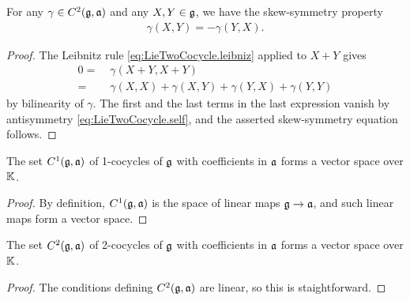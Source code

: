\begin{lemma}
  \label{lem:LieTwoCocycle_skew_symmetry}
  \leanok
  For any $\gamma \in C^2(\mathfrak{g},\mathfrak{a})$ and any $X,Y \in \mathfrak{g}$,
  we have the skew-symmetry property
  \begin{align*}
    \gamma(X,Y) = - \gamma(Y,X) .
  \end{align*}
\end{lemma}
\begin{proof}
  \leanok
  The Leibnitz rule \eqref{eq:LieTwoCocycle.leibniz}
  applied to $X+Y$ gives
  \begin{align*}
    0 = \; & \gamma(X+Y,X+Y) \\
      = \; & \gamma(X,X) + \gamma(X,Y) + \gamma(Y,X) + \gamma(Y,Y)
  \end{align*}
  by bilinearity of $\gamma$. The first and the last terms
  in the last expression vanish by antisymmetry \eqref{eq:LieTwoCocycle.self},
  and the asserted skew-symmetry equation follows.
\end{proof}

\begin{lemma}
  \label{lem:LieOneCocycle_vectorSpace}
  \leanok
  The set $C^1(\mathfrak{g}, \mathfrak{a})$ of 1-cocycles of $\mathfrak{g}$ with
  coefficients in $\mathfrak{a}$ forms a vector space over $\mathbb{K}$.
\end{lemma}
\begin{proof}
  \leanok
  By definition, $C^1(\mathfrak{g}, \mathfrak{a})$ is the space of
  linear maps $\mathfrak{g} \to \mathfrak{a}$, and such linear maps form
  a vector space.
\end{proof}

\begin{lemma}
  \label{lem:LieTwoCocycle_vectorSpace}
  \leanok
  The set $C^2(\mathfrak{g}, \mathfrak{a})$ of 2-cocycles of $\mathfrak{g}$ with
  coefficients in $\mathfrak{a}$ forms a vector space over $\mathbb{K}$.
\end{lemma}
\begin{proof}
  \leanok
  The conditions defining $C^2(\mathfrak{g}, \mathfrak{a})$ are linear,
  so this is staightforward.
\end{proof}

